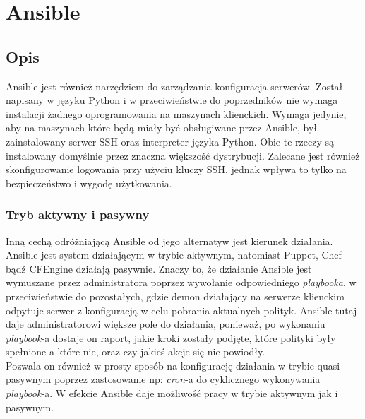 \section{Ansible}
\label{sec:konfiguracja_ansible}
\subsection{Opis}
Ansible\cite{ansible} jest również narzędziem do zarządzania konfiguracja serwerów. Został napisany w języku Python i w przeciwieństwie do poprzedników nie wymaga instalacji żadnego oprogramowania na maszynach klienckich.
Wymaga jedynie, aby na maszynach które będą miały być obsługiwane przez Ansible, był zainstalowany serwer SSH oraz interpreter języka Python. Obie te rzeczy są instalowany domyślnie przez znaczna większość dystrybucji.
Zalecane jest również skonfigurowanie logowania przy użyciu kluczy SSH, jednak wpływa to tylko na bezpieczeństwo i wygodę użytkowania.\\
\subsubsection{Tryb aktywny i pasywny}
Inną cechą odróżniającą Ansible od jego alternatyw jest kierunek działania.
Ansible jest system działającym w trybie aktywnym, natomiast Puppet, Chef bądź CFEngine działają pasywnie.
Znaczy to, że działanie Ansible jest wymuszane przez administratora poprzez wywołanie odpowiedniego \textit{playbooka}, w przeciwieństwie do pozostałych, gdzie demon działający na serwerze klienckim odpytuje serwer z konfiguracją w celu pobrania aktualnych polityk.
Ansible tutaj daje administratorowi większe pole do działania, ponieważ, po wykonaniu \textit{playbook}-a dostaje on raport, jakie kroki zostały podjęte, które polityki były spełnione a które nie, oraz czy jakieś akcje się nie powiodły.\\
Pozwala on również w prosty sposób na konfigurację działania w trybie quasi-pasywnym poprzez zastosowanie np: \textit{cron}-a do cyklicznego wykonywania \textit{playbook}-a.
W efekcie Ansible daje możliwość pracy w trybie aktywnym jak i pasywnym.
